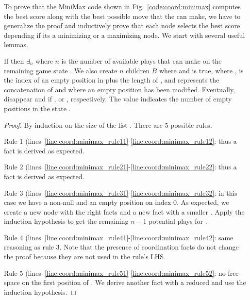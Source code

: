To prove that the MiniMax code shown in Fig.~\ref{code:coord:minimax} computes
the best score along with the best possible move that the  can
make, we have to generalize the proof and inductively prove that each node
selects the best score depending if its a minimizing or a maximizing node. We
start with several useful lemmas.

\begin{lemma}

If  then $\exists_n$ where $n$ is the number of available plays that
 can make on the remaining game state .  We also
create $n$ children $B$ where  and  is true, where ,  is the index of an empty position in
 plus the length of , and  represents
the concatenation of  and  where an empty
position has been modified. Eventually,  disappear and if
,  or ,
respectively. The value  indicates the number of empty positions in
the state .

\end{lemma}

\begin{proof}
By induction on the size of the list . There are 5 possible rules.

Rule 1 (lines~\ref{line:coord:minimax_rule11}-\ref{line:coord:minimax_rule12}:
 thus a  fact is derived as expected.

Rule 2 (lines~\ref{line:coord:minimax_rule21}-\ref{line:coord:minimax_rule22}:
 thus a  fact is derived as expected.

Rule 3 (lines~\ref{line:coord:minimax_rule31}-\ref{line:coord:minimax_rule32}:
in this case we have a non-null  and an empty position on index
0. As expected, we create a new  node with the right facts and a new
 fact with a smaller . Apply the induction
hypothesis to get the remaining $n-1$ potential plays for .

Rule 4 (lines~\ref{line:coord:minimax_rule41}-\ref{line:coord:minimax_rule42}:
same reasoning as rule 3. Note that the presence of coordination facts do not
change the proof because they are not used in the rule's LHS.

Rule 5 (lines~\ref{line:coord:minimax_rule51}-\ref{line:coord:minimax_rule52}:
no free space on the first position of . We derive another
 fact with a reduced  and use the induction
hypothesis.

\end{proof}

